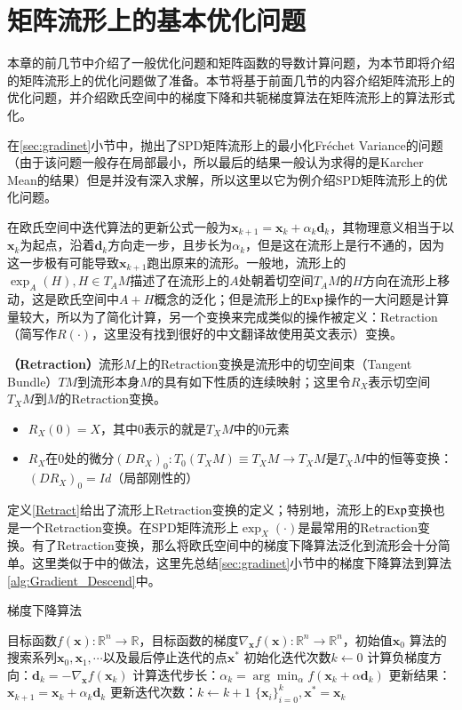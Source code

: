 \section{矩阵流形上的基本优化问题}
本章的前几节中介绍了一般优化问题和矩阵函数的导数计算问题，为本节即将介绍的矩阵流形上的优化问题做了准备。本节将基于前面几节的内容介绍矩阵流形上的优化问题，并介绍欧氏空间中的梯度下降和共轭梯度算法在矩阵流形上的算法形式化。

在\ref{sec:gradinet}小节中，抛出了SPD矩阵流形上的最小化Fr\'echet Variance的问题（由于该问题一般存在局部最小，所以最后的结果一般认为求得的是Karcher Mean的结果）但是并没有深入求解，所以这里以它为例介绍SPD矩阵流形上的优化问题。

在欧氏空间中迭代算法的更新公式一般为$\bm{x}_{k+1}=\bm{x}_{k}+\alpha_{k} \bm{d}_{k}$，其物理意义相当于以$\bm{x}_{k}$为起点，沿着$\bm{d}_{k}$方向走一步，且步长为$\alpha_{k}$，但是这在流形上是行不通的，因为这一步极有可能导致$\bm{x}_{k+1}$跑出原来的流形。一般地，流形上的$\exp_{A}(H),H \in T_{A}M$描述了在流形上的$A$处朝着切空间$T_{A}M$的$H$方向在流形上移动，这是欧氏空间中$A+H$概念的泛化；但是流形上的$\rm Exp$操作的一大问题是计算量较大，所以为了简化计算，另一个变换来完成类似的操作被定义：Retraction（简写作$R(\cdot)$，这里没有找到很好的中文翻译故使用英文表示）变换。
\begin{definition}
\label{Retract}
\textbf{（Retraction）}流形$M$上的Retraction变换是流形中的切空间束（Tangent Bundle）$TM$到流形本身$M$的具有如下性质的连续映射；这里令$R_{X}$表示切空间$T_{X}M$到$M$的Retraction变换。
\begin{itemize}
\label{Retraction_rules}
\item $R_{X}(0)=X$，其中$0$表示的就是$T_{X}M$中的0元素
\item $R_{X}$在$0$处的微分$(DR_{X})_{0}:T_{0}(T_{X}M)\equiv T_{X}M\rightarrow T_{X}M$是$T_{X}M$中的恒等变换：$(DR_{X})_{0}=Id$（局部刚性的）
\end{itemize}
\end{definition}

定义\ref{Retract}给出了流形上Retraction变换的定义；特别地，流形上的$\rm Exp$变换也是一个Retraction变换。在SPD矩阵流形上$\exp_{X}(\cdot)$是最常用的Retraction变换。有了Retraction变换，那么将欧氏空间中的梯度下降算法泛化到流形会十分简单。这里类似于\cite{Maniopt_DiscreteCurveFitting}中的做法，这里先总结\ref{sec:gradinet}小节中的梯度下降算法到算法\ref{alg:Gradient_Descend}中。
\begin{algorithm}[htb]
\caption{梯度下降算法}
\label{alg:Gradient_Descend}
\begin{algorithmic}[1]
\REQUIRE 目标函数$f(\bm{x}):\mathbb{R}^{n}\rightarrow \mathbb{R}$，目标函数的梯度$\nabla_{\bm{x}} f(\bm{x}):\mathbb{R}^{n}\rightarrow \mathbb{R}^{n}$，初始值$\bm{x}_0$
\ENSURE 算法的搜索系列$\bm{x}_0,\bm{x}_1,\cdots$以及最后停止迭代的点$\bm{x}^{*}$
\STATE 初始化迭代次数$k\leftarrow 0$
\STATE 计算负梯度方向：$\bm{d}_{k}=-\nabla_{\bm{x}}f(\bm{x}_k)$
\STATE 计算迭代步长：$\alpha_{k}=\arg\min_{\alpha}f(\bm{x}_{k}+\alpha\bm{d}_{k})$
\STATE 更新结果：$\bm{x}_{k+1}=\bm{x}_{k}+\alpha_{k}\bm{d}_{k}$
\STATE 更新迭代次数：$k\leftarrow k+1$
\ENDWHILE
\RETURN $\{\bm{x}_i\}_{i=0}^{k},\bm{x}^{*}=\bm{x}_{k}$
\end{algorithmic}
\end{algorithm}

